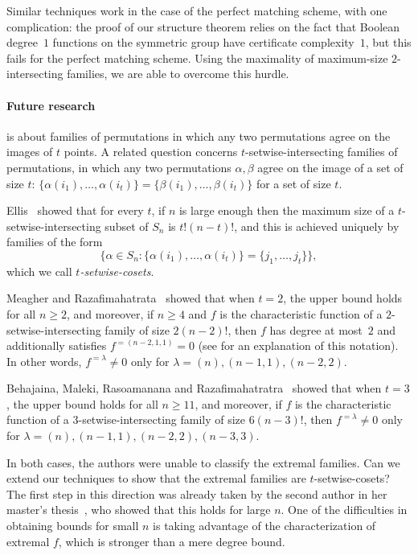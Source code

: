 \documentclass[10pt,a4paper]{amsart}
\theoremstyle{definition}
\begin{document}
Similar techniques work in the case of the perfect matching scheme, with one complication: the proof of our structure theorem relies on the fact that Boolean degree~$1$ functions on the symmetric group have certificate complexity~$1$, but this fails for the perfect matching scheme. Using the maximality of maximum-size $2$-intersecting families, we are able to overcome this hurdle.

\paragraph{Future research}  is about families of permutations in which any two permutations agree on the images of $t$ points. A related question concerns $t$-setwise-intersecting families of permutations, in which any two permutations $\alpha,\beta$ agree on the image of a set of size $t$: $\{\alpha(i_1),\ldots,\alpha(i_t)\} = \{\beta(i_1),\ldots,\beta(i_t)\}$ for a set of size $t$. %

Ellis~\cite{EllisSetwise} showed that for every $t$, if $n$ is large enough then the maximum size of a $t$-setwise-intersecting subset of $S_n$ is $t! (n-t)!$, and this is achieved uniquely by families of the form
\[
 \bigl\{\alpha \in S_n : \{\alpha(i_1),\ldots,\alpha(i_t)\} = \{j_1,\ldots,j_t\}\bigr\},
\]
which we call \emph{$t$-setwise-cosets}.

Meagher and Razafimahatrata~\cite{MR21} showed that when $t = 2$, the upper bound holds for all $n \geq 2$, and moreover, if $n \geq 4$ and $f$ is the characteristic function of a $2$-setwise-intersecting family of size $2(n-2)!$, then $f$ has degree at most~$2$ and additionally satisfies $f^{=(n-2,1,1)} = 0$ (see  for an explanation of this notation). In other words, $f^{=\lambda} \neq 0$ only for $\lambda = (n), (n-1,1), (n-2,2)$.

Behajaina, Maleki, Rasoamanana and Razafimahatratra~\cite{BMRR} showed that when $t = 3$, the upper bound holds for all $n \geq 11$, and moreover, if $f$ is the characteristic function of a $3$-setwise-intersecting family of size $6(n-3)!$, then $f^{=\lambda} \neq 0$ only for $\lambda = (n),(n-1,1),(n-2,2),(n-3,3)$.

In both cases, the authors were unable to classify the extremal families. Can we extend our techniques to show that the extremal families are $t$-setwise-cosets? The first step in this direction was already taken by the second author in her master's thesis~\cite{DafniThesis}, who showed that this holds for large $n$. One of the difficulties in obtaining bounds for small $n$ is taking advantage of the characterization of extremal $f$, which is stronger than a mere degree bound.
\end{document}
